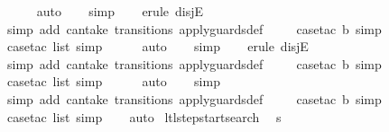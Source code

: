 \begin{isabellebody}
\ \ \ \ \isamarkupfalse%
\ auto{\isacharbrackleft}{}{\isacharbrackright}\isanewline
\ \ \isamarkupfalse%
\ simp\isanewline
\ \ \isamarkupfalse%
\ {\isacharparenleft}erule\ disjE{\isacharparenright}\isanewline
\ \ \ \isamarkupfalse%
\ {\isacharparenleft}simp\ add{\isacharcolon}\ can{\isacharunderscore}take\ transitions\ apply{\isacharunderscore}guards{\isacharunderscore}def{\isacharparenright}\isanewline
\ \ \ \isamarkupfalse%
\ {\isacharparenleft}case{\isacharunderscore}tac\ b{\isacharcomma}\ simp{\isacharparenright}\isanewline
\ \ \ \isamarkupfalse%
\ {\isacharparenleft}case{\isacharunderscore}tac\ list{\isacharcomma}\ simp{\isacharparenright}\isanewline
\ \ \ \ \isamarkupfalse%
\ auto{\isacharbrackleft}{}{\isacharbrackright}\isanewline
\ \ \isamarkupfalse%
\ simp\isanewline
\ \ \isamarkupfalse%
\ {\isacharparenleft}erule\ disjE{\isacharparenright}\isanewline
\ \ \ \isamarkupfalse%
\ {\isacharparenleft}simp\ add{\isacharcolon}\ can{\isacharunderscore}take\ transitions\ apply{\isacharunderscore}guards{\isacharunderscore}def{\isacharparenright}\isanewline
\ \ \ \isamarkupfalse%
\ {\isacharparenleft}case{\isacharunderscore}tac\ b{\isacharcomma}\ simp{\isacharparenright}\isanewline
\ \ \ \isamarkupfalse%
\ {\isacharparenleft}case{\isacharunderscore}tac\ list{\isacharcomma}\ simp{\isacharparenright}\isanewline
\ \ \ \ \isamarkupfalse%
\ auto{\isacharbrackleft}{}{\isacharbrackright}\isanewline
\ \ \isamarkupfalse%
\ simp\isanewline
\ \ \ \isamarkupfalse%
\ {\isacharparenleft}simp\ add{\isacharcolon}\ can{\isacharunderscore}take\ transitions\ apply{\isacharunderscore}guards{\isacharunderscore}def{\isacharparenright}\isanewline
\ \ \ \isamarkupfalse%
\ {\isacharparenleft}case{\isacharunderscore}tac\ b{\isacharcomma}\ simp{\isacharparenright}\isanewline
\ \ \ \isamarkupfalse%
\ {\isacharparenleft}case{\isacharunderscore}tac\ list{\isacharcomma}\ simp{\isacharparenright}\isanewline
\ \ \isamarkupfalse%
\ auto%
\endisatagproof
{\isafoldproof}%
%
\isadelimproof
\isanewline
%
\endisadelimproof
\isanewline
{}\isamarkupfalse%
\ ltl{\isacharunderscore}step{\isacharunderscore}startsearch{\isacharcolon}\isanewline
\ \ {\isachardoublequoteopen}s\ {\isasymin}\ {\isacharbraceleft}{}{\isacharcomma}\ {}{\isacharcomma}\ {}{\isacharcomma}\ {}{\isacharbraceright}\ {\isasymLongrightarrow}\isanewline

\end{isabellebody}
